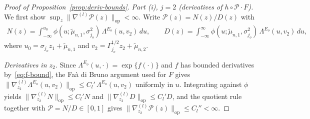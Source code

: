 \documentclass[12pt]{article}
\newcommand{\op}{\mathrm{op}}
\newcommand{\cP}{{\mathcal{P}}}
\begin{document}
\begin{appendices}
\begin{proof}[Proof of Proposition~\ref{prop:deriv-bounds}]
\medskip
\textit{Part (i), $j=2$ (derivatives of $h\circ\cP\cdot F$).}
We first show $\sup_z\|\nabla^{(l)}\cP(z)\|_{\op}<\infty$. Write
$\cP(z)=N(z)/D(z)$ with
\begin{align*}
  N(z)=\int_{-\infty}^{u_0}
    \phi(u;\widetilde\mu_{n,1},\sigma_{j_o}^2)\,\Lambda^{E_o}(u,v_2)\,du,
  \qquad
  D(z)=\int_{-\infty}^{\infty}
    \phi(u;\widetilde\mu_{n,1},\sigma_{j_o}^2)\,\Lambda^{E_o}(u,v_2)\,du,
\end{align*}
where $u_0=\sigma_{j_o}z_1+\widetilde\mu_{n,1}$ and
$v_2=\Gamma_{j_o}^{1/2}z_2+\widetilde\mu_{n,2}$.

\medskip\noindent\emph{Derivatives in $z_2$.}
Since $\Lambda^{E_o}(u,\cdot)=\exp\{f(\cdot)\}$ and $f$ has bounded
derivatives by~\eqref{eq:f-bound}, the Fa\`a di Bruno argument used for
$F$ gives
$\|\nabla^{(l)}_{z_2}\Lambda^{E_o}(u,v_2)\|_{\op}\le C_l'\,
\Lambda^{E_o}(u,v_2)$ uniformly in $u$. Integrating against $\phi$ yields
$\|\nabla^{(l)}_{z_2}N\|_{\op}\le C_l' N$ and
$\|\nabla^{(l)}_{z_2}D\|_{\op}\le C_l' D$, and the quotient rule together
with $\cP=N/D\in[0,1]$ gives
$\|\nabla^{(l)}_{z_2}\cP(z)\|_{\op}\le C_l''<\infty$.


\end{proof}
\end{appendices}
\end{document}
